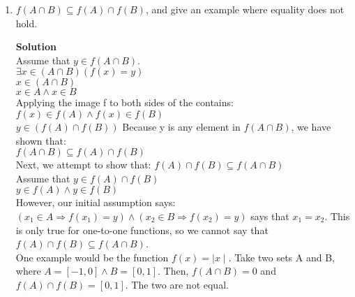\documentclass[11pt]{article}
\begin{document}
\begin{enumerate}
\pagebreak
\item $f(A \cap B) \subseteq f(A) \cap f(B)$, and give an example where equality does not hold.
\begin{mdframed} \textbf{Solution} \\
Assume that $y \in f(A \cap B)$. \\
$\exists x \in (A \cap B)(f(x)=y)$ \\
$x \in (A \cap B)$ \\
$x \in A \land x \in B$ \\
Applying the image f to both sides of the contains: \\
$f(x) \in f(A) \land f(x) \in f(B)$ \\
$y \in (f(A) \cap f(B))$
Because y is any element in $f(A \cap B)$, we have shown that: \\
$f(A \cap B) \subseteq f(A) \cap f(B)$ \\
Next, we attempt to show that:
$f(A) \cap f(B) \subseteq f(A \cap B)$ \\
Assume that $y \in f(A) \cap f(B)$ \\
$y \in f(A) \land y \in f(B)$ \\
However, our initial assumption says: \\
$(x_1 \in A \Rightarrow f(x_1) = y) \land (x_2 \in B \Rightarrow f(x_2) = y)$ says that $x_1 = x_2$. This is only true for one-to-one functions, so we cannot say that $f(A) \cap f(B) \subseteq f(A \cap B)$. \\
One example would be the function $f(x) = \mid x \mid $. Take two sets A and B, where $A=[-1,0] \land B=[0,1]$. Then, $f(A \cap B) = {0}$ and $f(A) \cap f(B) = [0,1]$. The two are not equal. 
\end{mdframed}


\end{enumerate}
\end{document}
